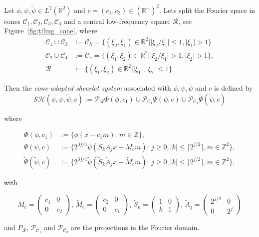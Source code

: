 \bigskip

\begin{defn}
\label{def:cone_shearlets}
Let $\phi,\psi,\tilde{\psi}\in L^2(\mathbb{R}^2)$ and $c=(c_1,c_2)\in (\mathbb{R}^+)^2$. Lets split the Fourier space in cones $\mathcal{C}_1, \mathcal{C}_2, \mathcal{C}_3,\mathcal{C}_4$ and a central low-frequency square $\mathcal{R}$, see Figure~\ref{fig:tiling_cone}, where 
$$
\begin{aligned}
\mathcal{C}_1\cup \mathcal{C}_3 &:=\mathcal{C}_h =\{ (\xi_2,\xi_1)\in\mathbb{R}^2| |\xi_2/\xi_1|\leq 1,|\xi_1|>1\}\\
\mathcal{C}_2\cup \mathcal{C}_4 &:= \mathcal{C}_v =\{ (\xi_1,\xi_2)\in\mathbb{R}^2||\xi_2/\xi_1|> 1, |\xi_2|>1\},\\
\mathcal{R}&:=\{ (\xi_1,\xi_2)\in\mathbb{R}^2||\xi_1|,|\xi_2|\leq 1\}
\end{aligned}
$$
 

Then the \textit{cone-adapted shearlet system} associated with $\phi,\psi,\tilde{\psi}$ and $c$ is defined by 
$$
\mathcal{SH}(\phi,\psi,\tilde{\psi},c):=\mathcal{P}_{\mathcal{R}}\Phi(\phi,c_1)\cup \mathcal{P}_{\mathcal{C}_1}\Psi(\psi,c)\cup\mathcal{P}_{\mathcal{C}_2}\tilde{\Psi}(\tilde{\psi},c)
$$

where

$$
\begin{aligned}
\Phi(\phi,c_1)&:=\{\phi(x-c_1m)\text{: }m\in\mathbb{Z}\},\\
\Psi(\psi,c)&:=\{2^{3j/4}\psi(S_kA_jx-M_cm)\text{: } j\geq 0,|k|\leq\lceil 2^{j/2}\rceil,m\in\mathbb{Z}^2\},\\
\tilde{\Psi}(\tilde{\psi},c)&:=\{2^{3j/4}\tilde{\psi}(\tilde{S}_k\tilde{A}_jx-\tilde{M}_cm)\text{: } j \geq 0,|k|\leq\lceil 2^{j/2}\rceil,m\in\mathbb{Z}^2\},
\end{aligned}
$$

with 

$$
M_c=\left(\begin{matrix} c_1 & 0 \\ 0 & c_2\end{matrix}\right)\text{,  }
\tilde{M}_c=\left(\begin{matrix} c_2 & 0 \\ 0 & c_1\end{matrix}\right) \text{,  }
\tilde{S}_k=\left(\begin{matrix} 1 & 0 \\ k & 1 \end{matrix}\right)\text{,  }
\tilde{A}_j=\left(\begin{matrix} 2^{j/2} & 0 \\ 0 & 2^j\end{matrix}\right)
$$

and $P_{\mathcal{R}}$, $\mathcal{P}_{\mathcal{C}_1}$ and $\mathcal{P}_{\mathcal{C}_2}$ are the projections in the Fourier domain.
\end{defn}

